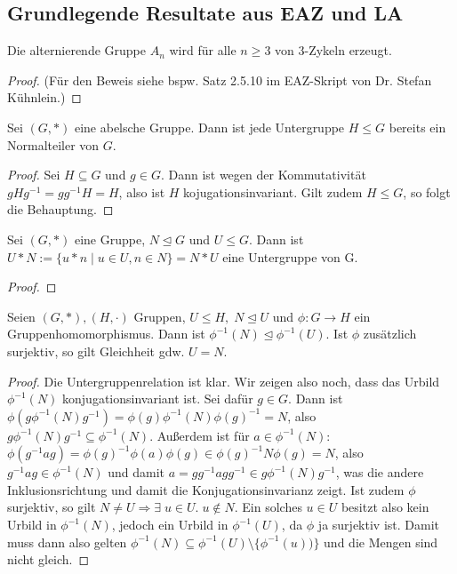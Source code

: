\documentclass[../main.tex]{subfiles}
\begin{document}
\subsection{Grundlegende Resultate aus EAZ und LA}

\begin{lemma}\label{lem:found:0}
    \TODO
\end{lemma}

\begin{lemma}\label{lem:found:1}
Die alternierende Gruppe $A_n$ wird für alle $n \geq 3$ von 3-Zykeln erzeugt.
\end{lemma}
    \begin{proof}
        \TODO (Für den Beweis siehe bspw. Satz 2.5.10 im EAZ-Skript von Dr. Stefan Kühnlein.)
    \end{proof}
    
\begin{lemma}\label{lem:found:2}
Sei $(G,*)$ eine abelsche Gruppe. Dann ist jede Untergruppe $H \leq G$ bereits ein Normalteiler von $G$.
\end{lemma}
\begin{proof}
    Sei $H \subseteq G$ und $g \in G$. Dann ist wegen der Kommutativität $gHg^{-1} = gg^{-1}H = H$, also ist $H$ kojugationsinvariant. Gilt zudem $H \leq G$, so folgt die Behauptung.
\end{proof}
    
\begin{lemma}\label{lem:found:3}
    Sei $(G,*)$ eine Gruppe, $N \trianglelefteq G$ und $U \leq G$. Dann ist $U*N := \{u*n \mid u \in U, n \in N\} = N*U$ eine Untergruppe von G.
\end{lemma}
\begin{proof}
    \TODO
\end{proof}
    
\begin{lemma}\label{lem:found:4}
    Seien $(G,*), (H,\cdot)$ Gruppen, $U \leq H, \; N \trianglelefteq U$ und $\phi: G \rightarrow H$ ein Gruppenhomomorphismus. Dann ist $\phi^{-1}(N) \trianglelefteq \phi^{-1}(U)$. Ist $\phi$ zusätzlich surjektiv, so gilt Gleichheit gdw. $U = N$.
\end{lemma}
\begin{proof} 
    Die Untergruppenrelation ist klar. Wir zeigen also noch, dass das Urbild $\phi^{-1}(N)$ konjugationsinvariant ist. Sei dafür $g \in G$. Dann ist $\phi(g\phi^{-1}(N)g^{-1}) = \phi(g)\phi^{-1}(N)\phi(g)^{-1} = N$, also $g\phi^{-1}(N)g^{-1} \subseteq \phi^{-1}(N)$. Außerdem ist für $a \in \phi^{-1}(N)$: $\phi(g^{-1}ag) = \phi(g)^{-1}\phi(a)\phi(g) \in \phi(g)^{-1}N\phi(g) = N$, also $g^{-1}ag \in \phi^{-1}(N)$ und damit $a = gg^{-1}agg^{-1} \in g\phi^{-1}(N)g^{-1}$, was die andere Inklusionsrichtung und damit die Konjugationsinvarianz zeigt.
    Ist zudem $\phi$ surjektiv, so gilt $N \neq U \Rightarrow \exists \; u \in U. \; u \notin N$. Ein solches $u \in U$ besitzt also kein Urbild in $\phi^{-1}(N)$, jedoch ein Urbild in $\phi^{-1}(U)$, da $\phi$ ja surjektiv ist. Damit muss dann also gelten $\phi^{-1}(N) \subseteq \phi^{-1}(U)\setminus\{\phi^{-1}(u))\}$ und die Mengen sind nicht gleich.
\end{proof}
    
\end{document}
